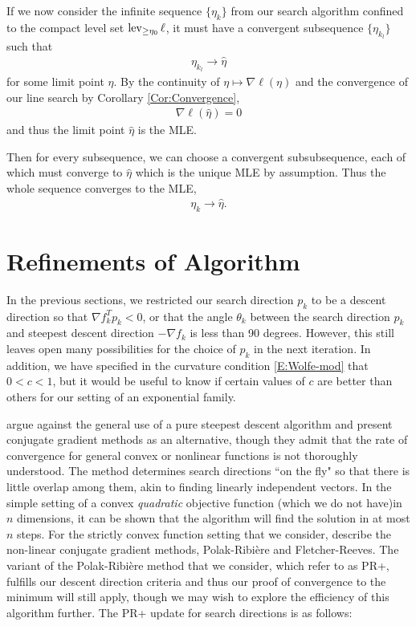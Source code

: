 If we now consider the infinite sequence $\{\eta_k\}$ from our search algorithm confined to the compact level set $\operatorname{lev}_{\geq \eta_0} \ell$, it must have a convergent subsequence $\{\eta_{k_l}\}$ such that
\begin{align*}
	\eta_{k_l} \to \hat{\eta}
\end{align*}
for some limit point $\hat{\eta}$.  By the continuity of $\eta \mapsto \nabla \ell(\eta)$ and the convergence of our line search by Corollary \ref{Cor:Convergence},
\begin{align*}
	\nabla \ell(\hat{\eta}) = 0
\end{align*}
and thus the limit point $\hat{\eta}$ is the MLE.

Then for every subsequence, we can choose a convergent subsubsequence, each of which must converge to $\hat{\eta}$ which is the unique MLE by assumption.  Thus the whole sequence converges to the MLE,  
\begin{align*}
	\eta_{k} \to \hat{\eta}.
\end{align*}

\section{Refinements of Algorithm}
In the previous sections, we restricted our search direction $p_k$ to be a descent direction so that $\nabla f_k^T p_k < 0$, or that the angle $\theta_k$ between the search direction $p_k$ and steepest descent direction $-\nabla f_k$ is less than 90 degrees.  However, this still leaves open many possibilities for the choice of $p_k$ in the next iteration.  In addition, we have specified in the curvature condition \eqref{E:Wolfe-mod} that $0 < c < 1$, but it would be useful to know if certain values of $c$ are better than others for our setting of an exponential family.

\citet{NW} argue against the general use of a pure steepest descent algorithm and present conjugate gradient methods as an alternative, though they admit that the rate of convergence for general convex or nonlinear functions is not thoroughly understood.  The method determines search directions ``on the fly" so that there is little overlap among them, akin to finding linearly independent vectors.  In the simple setting of a convex \emph{quadratic} objective function (which we do not have)in $n$ dimensions, it can be shown that the algorithm will find the solution in at most $n$ steps.  For the strictly convex function setting that we consider, \citeauthor{NW} describe the non-linear conjugate gradient methods, Polak-Ribi\`{e}re and  Fletcher-Reeves.  The variant of the Polak-Ribi\`{e}re method that we consider, which \citeauthor{NW} refer to as PR+, fulfills our descent direction criteria and thus our proof of convergence to the minimum will still apply, though we may wish to explore the efficiency of this algorithm further.  The PR+ update for search directions is as follows:

